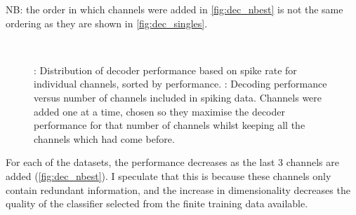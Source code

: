 NB: the order in which channels were added in \autoref{fig:dec_nbest} is not the same ordering as they are shown in \autoref{fig:dec_singles}.

\begin{figure}[htbp]
    ~~
    \caption{
\protect{}: Distribution of decoder performance based on spike rate for individual channels, sorted by performance.
\protect{}: Decoding performance versus number of channels included in spiking data.
Channels were added one at a time, chosen so they maximise the decoder performance for that number of channels whilst keeping all the channels which had come before.
}
    \label{fig:dec_n}
\end{figure}

For each of the datasets, the performance decreases as the last 3 channels are added (\autoref{fig:dec_nbest}).
I speculate that this is because these channels only contain redundant information, and the increase in dimensionality decreases the quality of the classifier selected from the finite training data available.


